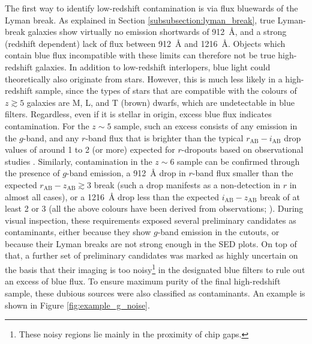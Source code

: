 The first way to identify low-redshift contamination is via flux bluewards of the Lyman break. As explained in Section \ref{subsubsection:lyman_break}, true Lyman-break galaxies show virtually no emission shortwards of \SI{912}{\angstrom}, and a strong (redshift dependent) lack of flux between \SI{912}{\angstrom} and \SI{1216}{\angstrom}. Objects which contain blue flux incompatible with these limits can therefore not be true high-redshift galaxies. In addition to low-redshift interlopers, blue light could theoretically also originate from stars. However, this is much less likely in a high-redshift sample, since the types of stars that are compatible with the colours of $z\gtrsim5$ galaxies are M, L, and T (brown) dwarfs, which are undetectable in blue filters. Regardless, even if it is stellar in origin, excess blue flux indicates contamination. For the $z\sim5$ sample, such an excess consists of any emission in the $g$-band, and any $r$-band flux that is brighter than the typical $r_{\mathrm{AB}}-i_{\mathrm{AB}}$ drop values of around 1 to 2 (or more) expected for $r$-dropouts based on observational studies \citep{2004AJ....127.2598S,2010A&A...523A..74V}. Similarly, contamination in the $z\sim6$ sample can be confirmed through the presence of $g$-band emission, a \SI{912}{\angstrom} drop in $r$-band flux smaller than the expected $r_{\mathrm{AB}}-z_{\mathrm{AB}}\gtrsim 3$ break (such a drop manifests as a non-detection in $r$ in almost all cases), or a \SI{1216}{\angstrom} drop less than the expected $i_{\mathrm{AB}}-z_{\mathrm{AB}}$ break of at least 2 or 3 (all the above colours have been derived from observations; \citealt{2004AJ....127.2598S,2015MNRAS.452.1817B,2013AJ....145....4W}). During visual inspection, these requirements exposed several preliminary candidates as contaminants,  either because they show $g$-band emission in the cutouts, or because their Lyman breaks are not strong enough in the SED plots. On top of that, a further set of preliminary candidates was marked as highly uncertain on the basis that their imaging is too noisy\footnote{These noisy regions lie mainly in the proximity of chip gaps.} in the designated blue filters to rule out an excess of blue flux. To ensure maximum purity of the final high-redshift sample, these dubious sources were also classified as contaminants. An example is shown in Figure \ref{fig:example_g_noise}. \par

